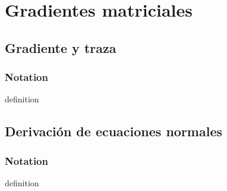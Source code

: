 \documentclass{beamer}
\begin{document}
\section{Gradientes matriciales}
\subsection{Gradiente y traza}
\begin{frame}
	\frametitle{Notation}
	definition
\end{frame}

\subsection{Derivación de ecuaciones normales}
\begin{frame}
	\frametitle{Notation}
	definition
\end{frame}
\end{document}
